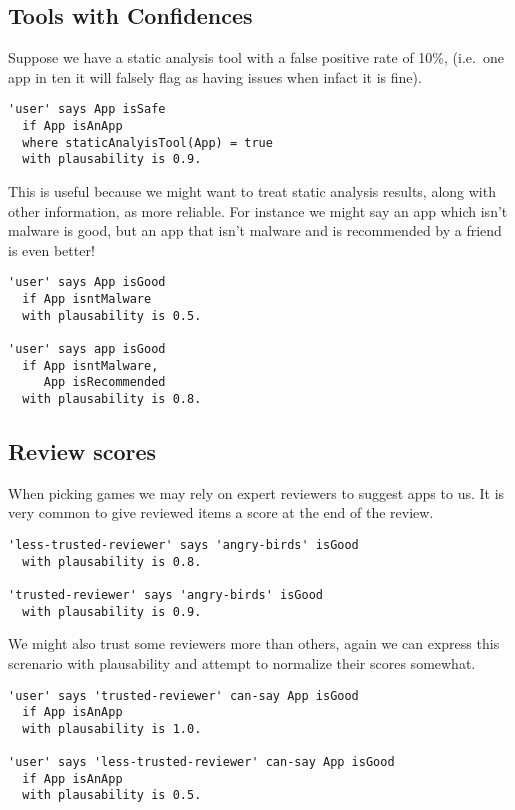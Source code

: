 \documentclass[a4paper]{article}
\begin{document}
\subsection{Tools with Confidences}

Suppose we have a static analysis tool with a false positive rate of 10\%, (i.e.~one app in ten it will falsely flag as having issues when infact it is fine).

\begin{lstlisting}
'user' says App isSafe
  if App isAnApp
  where staticAnalyisTool(App) = true
  with plausability is 0.9.
\end{lstlisting}

This is useful because we might want to treat static analysis results, along with other information, as more reliable.  For instance we might say an app which isn't malware is good, but an app that isn't malware and is recommended by a friend is even better!

\begin{lstlisting}
'user' says App isGood
  if App isntMalware
  with plausability is 0.5.

'user' says app isGood
  if App isntMalware,
     App isRecommended
  with plausability is 0.8.
\end{lstlisting}

\subsection{Review scores}

When picking games we may rely on expert reviewers to suggest apps to us.
It is very common to give reviewed items a score at the end of the review.

\begin{lstlisting}
'less-trusted-reviewer' says 'angry-birds' isGood
  with plausability is 0.8.

'trusted-reviewer' says 'angry-birds' isGood
  with plausability is 0.9.
\end{lstlisting}

We might also trust some reviewers more than others, again we can express this screnario with plausability and attempt to normalize their scores somewhat.

\begin{lstlisting}
'user' says 'trusted-reviewer' can-say App isGood
  if App isAnApp
  with plausability is 1.0.

'user' says 'less-trusted-reviewer' can-say App isGood
  if App isAnApp
  with plausability is 0.5.
\end{lstlisting}
\end{document}
